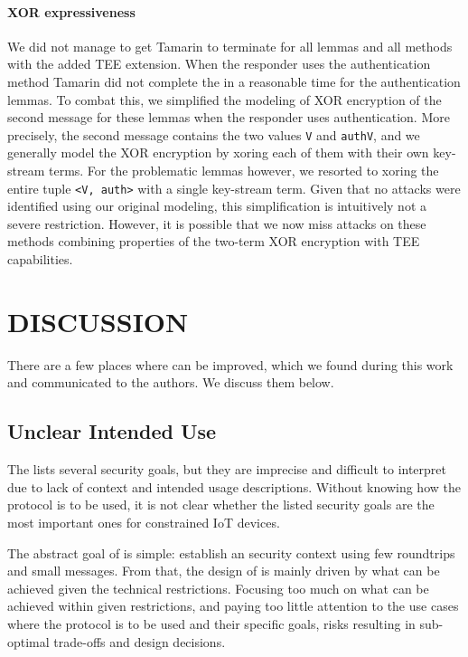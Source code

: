\documentclass[runningheads]{llncs}
\begin{document}
\paragraph{XOR expressiveness}
We did not manage to get Tamarin to terminate for all lemmas and all methods
with the added TEE extension.
%
When the responder uses the \mStat{} authentication method Tamarin did not
complete the in a reasonable time for the authentication lemmas.
%
To combat this, we simplified the modeling of XOR encryption of the second
message for these lemmas when the responder uses \mStat{} authentication.
%
More precisely, the second message contains the two values \verb|V| and
\verb|authV|, and we generally model the XOR encryption by xoring each of them
with their own key-stream terms.
%
For the problematic lemmas however, we resorted to xoring the entire tuple
\verb|<V, auth>| with a single key-stream term.
%
Given that no attacks were identified using our original modeling, this
simplification is intuitively not a severe restriction.
%
However, it is possible that we now miss attacks on these methods
combining properties of the two-term XOR encryption with TEE capabilities.
%

\section{\uppercase{Discussion}}
\label{sec:discussion}
There are a few places where \mEdhoc{} can be improved,
which we found during this work and communicated to the authors.
%
We discuss them below.
%

\subsection{Unclear Intended Use}
\label{sec:unclearProtocolUse}
%
The \mEdhoc{} \mSpec{} lists several security goals, but they are
imprecise and difficult to interpret due to lack of context and intended usage
descriptions.
%
Without knowing how the protocol is to be used,
it is not clear whether the listed security goals are the most important ones
for constrained IoT devices.
%

The abstract goal of \mEdhoc{} is simple: establish an \mOscore{} security
context using few roundtrips and small messages.
%
From that, the design of \mEdhoc{} is mainly driven by what
can be achieved given the technical restrictions.
%
Focusing too much on what can be achieved within given restrictions, and paying
too little attention to the use cases where the
protocol is to be used and their specific goals, risks resulting in
sub-optimal trade-offs and design decisions.
%
\end{document}
